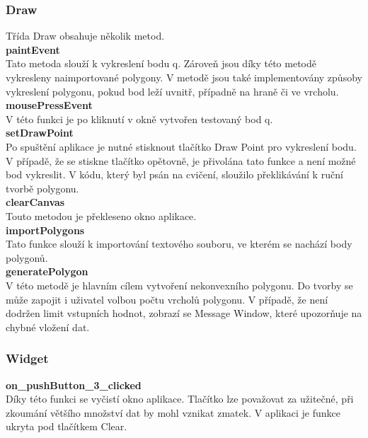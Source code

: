 \documentclass[a4paper, 12pt]{article}
\begin{document}
\subsubsection{Draw}
Třída Draw obsahuje několik metod.\\

\textbf{paintEvent}\\
Tato metoda slouží k vykreslení bodu q. Zároveň jsou díky této metodě vykresleny naimportované polygony. V metodě jsou také implementovány způsoby vykreslení polygonu, pokud bod leží uvnitř, případně na hraně či ve vrcholu.\\

\textbf{mousePressEvent}\\
V této funkci je po kliknutí v okně vytvořen testovaný bod q.\\

\textbf{setDrawPoint}\\
Po spuštění aplikace je nutné stisknout tlačítko Draw Point pro vykreslení bodu. V případě, že se stiskne tlačítko opětovně, je přivolána tato funkce a není možné bod vykreslit. V kódu, který byl psán na cvičení, sloužilo překlikávání k ruční tvorbě polygonu.\\

\textbf{clearCanvas}\\
Touto metodou je překleseno okno aplikace. \\

\textbf{importPolygons}\\
Tato funkce slouží k importování textového souboru, ve kterém se nachází body polygonů.\\

\textbf{generatePolygon}\\
V této metodě je hlavním cílem vytvoření nekonvexního polygonu. Do tvorby se může zapojit i uživatel volbou počtu vrcholů polygonu. V případě, že není dodržen limit vstupních hodnot, zobrazí se Message Window, které upozorňuje na chybné vložení dat.

\subsubsection{Widget}
\textbf{on\_pushButton\_3\_clicked}\\
Díky této funkci se vyčistí okno aplikace. Tlačítko lze považovat za užitečné, při zkoumání většího množství dat by mohl vznikat zmatek. V aplikaci je funkce ukryta pod tlačítkem Clear.\\
\end{document}
